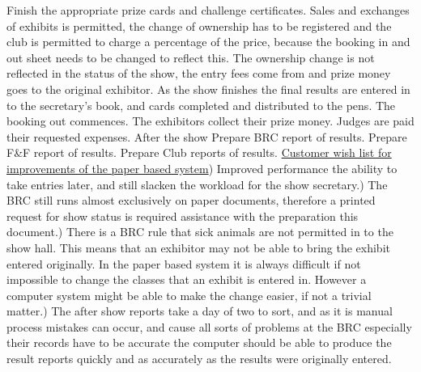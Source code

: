 \documentclass[a4paper,11pt]{report}
\begin{document}
Finish the appropriate prize cards and challenge certificates.\newline 
Sales and exchanges of exhibits is permitted, the change of ownership has to be registered and the club is permitted to charge a percentage of the price, because the booking in and out sheet needs to be changed to reflect this. The ownership change is not reflected in the status of the show, the entry fees come from and prize money goes to the original exhibitor.\newline 
As the show finishes the final results are entered in to the secretary's book, and cards completed and distributed to the pens.\newline
The booking out commences.\newline
The exhibitors collect their prize money.\newline 
Judges are paid their requested expenses.\newline\newline
After the show\newline
Prepare BRC report of results.\newline
Prepare F\&F report of results.\newline
Prepare Club reports of results.\newline \newline
\underline{Customer wish list for improvements of the paper based system}) Improved performance the ability to take entries later, and still slacken the workload for the show secretary.) The BRC still runs almost exclusively on paper documents, therefore a printed request for show status is required assistance with the preparation this document.) There is a BRC rule that sick animals are not permitted in to the show hall. This means that an exhibitor may not be able to bring the exhibit entered originally. In the paper based system it is always difficult if not impossible to change the classes that an exhibit is entered in. However a computer system might be able to make the change easier, if not a trivial matter.) The after show reports take a day of two to sort, and as it is manual process mistakes can occur, and cause all sorts of problems at the BRC especially their records have to be accurate the computer should be able to produce the result reports quickly and as accurately as the results were originally entered.\newline
\end{document}
